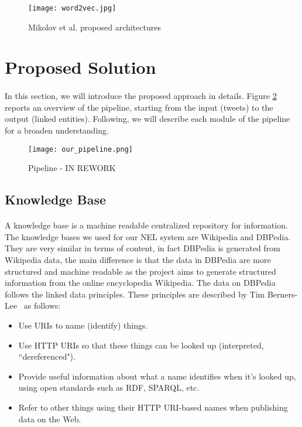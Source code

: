 \vspace{-5pt}
\begin{figure}[h!]
\texttt{[image: word2vec.jpg]}
\caption{Mikolov et al. proposed architectures}
\label{fig:w2v}
\end{figure}
\vspace{-15pt}

\section{Proposed Solution}
\paragraph{}In this section, we will introduce the proposed approach in details. Figure \ref{fig:pipeline} reports an overview of the pipeline, starting from the input (tweets) to the output (linked entities). Following, we will describe each module of the pipeline for a broaden understanding.

\vspace{-10pt}
\begin{figure}[h!]
\texttt{[image: our\_pipeline.png]}  
\caption{Pipeline - IN REWORK}
\label{fig:pipeline}
\end{figure}
\vspace{-10pt}

\subsection{Knowledge Base}
\paragraph{}
A knowledge base is a machine readable centralized repository for information. The knowledge bases we used for our NEL system are Wikipedia and DBPedia. They are very similar in terms of content, in fact DBPedia is generated from Wikipedia data, the main difference is that the data in DBPedia are more structured and machine readable as the project aims to generate structured information from the online encyclopedia Wikipedia. The data on DBPedia follows the linked data principles. These principles are described by Tim Berners-Lee~\cite{timbernerslee2006linkeddata} as follows:

\begin{itemize}[itemsep = 0.1em]
\item Use URIs to name (identify) things.
\item Use HTTP URIs so that these things can be looked up (interpreted, ``dereferenced").
\item Provide useful information about what a name identifies when it's looked up, using open standards such as RDF, SPARQL, etc.
\item Refer to other things using their HTTP URI-based names when publishing data on the Web.
\end{itemize}


